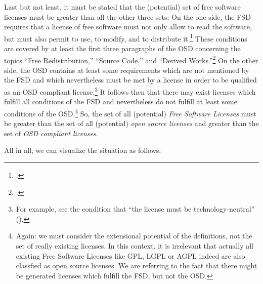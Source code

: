 Last but not least, it must be stated that the (potential) set of free software
licenses must be greater than all the other three sets: On the one side, the FSD
requires that a license of free software must not only allow to read the
software, but must also permit to use, to modify, and to distribute
it.\footcite[cf.][41]{Stallman1996a} These conditions are covered by at least
the first three paragraphs of the OSD concerning the topics \enquote{Free
Redistribution,} \enquote{Source Code,} and \enquote{Derived
Works.}\footcite[cf.][\nopage wp]{OSI2012a} On the other side, the OSD contains
at least some requirements which are not mentioned by the FSD and which
nevertheless must be met by a license in order to be qualified as an OSD
compliant license.\footnote{For example, see the condition that \enquote{the
license must be technology-neutral} (\cite[cf.][\nopage wp]{OSI2012a}).} It
follows then that there may exist licenses which fulfill all conditions of the
FSD and nevertheless do not fulfill at least some conditions of the
OSD.\footnote{Again: we must consider the extensional potential of the
definitions, not the set of really existing licenses. In this context, it is
irrelevant that actually all existing Free Software Licenses like GPL, LGPL or
AGPL indeed are also classfied as open source licenses. We are referring to the
fact that there might be generated licenses which fulfill the FSD, but not the
OSD.} So, the set of all (potential) \emph{Free Software Licenses} must be
greater than the set of all (potential) \emph{open source licenses} and greater
than the set of \emph{OSD compliant licenses}.

All in all, we can visualize the situation as follows:


